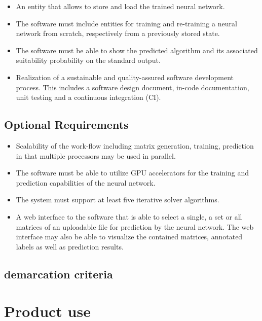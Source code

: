 \documentclass[parskip=full]{scrartcl}
\begin{document}
\begin{itemize}
\item An entity that allows to store and load the trained neural network.

\item The software must include entities for training and re-training a neural network from scratch, respectively from a previously stored state.

\item The software must be able to show the predicted algorithm and its associated suitability probability on the standard output.

\item Realization of a sustainable and quality-assured software development process. This includes a software design document, in-code documentation, unit testing and a continuous integration (CI).

\end{itemize}

\subsection{Optional Requirements}

\begin{itemize}
    
\item Scalability of the work-flow including matrix generation, training, prediction in that multiple processors may be used in parallel.

\item The software must be able to utilize GPU accelerators for the training and prediction capabilities of the neural network.

\item The system must support at least five iterative solver algorithms.

\item A web interface to the software that is able to select a single, a set or all matrices of an uploadable file for prediction by the neural network. The web interface may also be able to visualize the contained matrices, annotated labels as well as prediction results.

\end{itemize}

\subsection{demarcation criteria}

\section{Product use}
\end{document}
